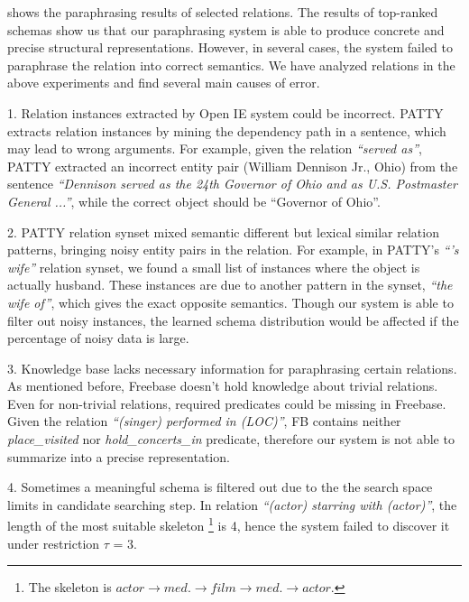  shows the paraphrasing results of 
selected relations.
The results of top-ranked schemas show us that our paraphrasing system
is able to produce concrete and precise structural representations.
However, in several cases, the system failed to paraphrase the relation into
correct semantics. We have analyzed relations in the above experiments and
find several main causes of error.

1. Relation instances extracted by Open IE system could be incorrect.
PATTY extracts relation instances by mining the dependency path in a sentence,
which may lead to wrong arguments.
For example, given the relation \textit{``served as''}, PATTY extracted
an incorrect entity pair (William Dennison Jr., Ohio) from the sentence
\textit{``Dennison served as the 24th Governor of Ohio and as U.S. Postmaster General ...''},
while the correct object should be ``Governor of Ohio''.

2. PATTY relation synset mixed semantic different but lexical similar
relation patterns, bringing noisy entity pairs in the relation.
For example, in PATTY's \textit{``'s wife''} relation synset, we found a small list of instances
where the object is actually husband.
These instances are due to another pattern in the synset,
\textit{``the wife of''}, which gives the exact opposite semantics.
Though our system is able to filter out noisy instances, the learned schema
distribution would be affected if the percentage of noisy data is large.

3. Knowledge base lacks necessary information for paraphrasing certain relations.
As mentioned before, Freebase doesn't hold knowledge about trivial relations.
Even for non-trivial relations, required predicates could be missing in Freebase.
Given the relation \textit{``(singer) performed in (LOC)''}, FB contains			%
neither \textit{place\_visited} nor \textit{hold\_concerts\_in} predicate, therefore
our system is not able to summarize into a precise representation.

4. Sometimes a meaningful schema is filtered out due to the 
the search space limits in candidate searching step.
In relation \textit{``(actor) starring with (actor)''}, 
the length of the most suitable skeleton
\footnote{The skeleton is $actor \rightarrow med. \rightarrow film \rightarrow med. \rightarrow actor$.}
is 4, hence the system failed to discover it under restriction $\tau$ = 3.

